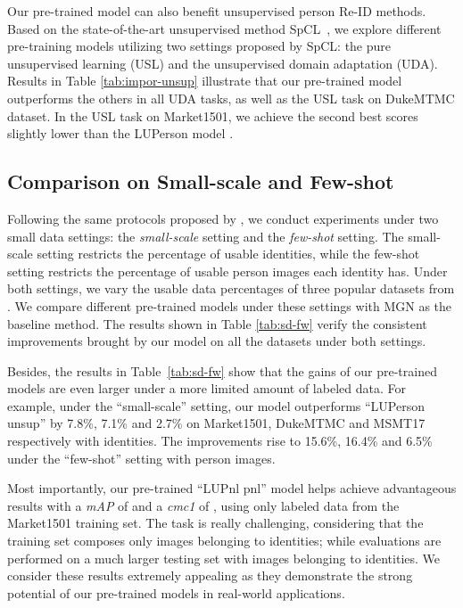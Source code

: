 \documentclass[10pt,twocolumn,letterpaper]{article}
\begin{document}
Our pre-trained model can also benefit unsupervised person Re-ID methods. 
Based on the state-of-the-art unsupervised method SpCL~\cite{ge2020selfpaced}, 
we explore different pre-training models utilizing two settings proposed by SpCL: the pure unsupervised learning (USL) and the unsupervised domain adaptation (UDA).
Results in Table \ref{tab:impor-unsup} illustrate that our pre-trained model outperforms the others in all UDA tasks, as well as the USL task on DukeMTMC dataset. 
In the USL task on Market1501, we achieve the second best scores slightly lower than the LUPerson model \cite{fu2020unsupervised}.

\subsection{Comparison on Small-scale and Few-shot}


Following the same protocols proposed by \cite{fu2020unsupervised}, we conduct experiments under two small data settings: the \emph{small-scale} setting and the \emph{few-shot} setting.
The small-scale setting restricts the percentage of usable identities, while the few-shot setting restricts the percentage of usable person images each identity has.
Under both settings, we vary the usable data percentages of three popular datasets from . 
We compare different pre-trained models under these settings with MGN as the baseline method.
The results shown in Table \ref{tab:sd-fw} verify the consistent improvements brought by our model on all the datasets under both settings.

Besides, the results in Table~\ref{tab:sd-fw} show that the gains of our pre-trained models are even larger under a {more limited amount of labeled data}.
For example, under the ``small-scale'' setting, our model outperforms ``LUPerson unsup'' by 7.8\%, 7.1\% and 2.7\% on Market1501, DukeMTMC and MSMT17 respectively with  identities.
The improvements rise to 15.6\%, 16.4\% and 6.5\% under the ``few-shot'' setting with  person images. 

Most importantly, our pre-trained ``LUPnl pnl'' model helps achieve advantageous results with a \emph{mAP} of  and a \emph{cmc1} of , using only  labeled data from the Market1501 training set. The task is really challenging, considering that the training set composes only  images belonging to  identities; while evaluations are performed on a much larger testing set with  images belonging to  identities.
We consider these results extremely appealing as they demonstrate the strong potential of our pre-trained models in real-world applications.  
\end{document}
